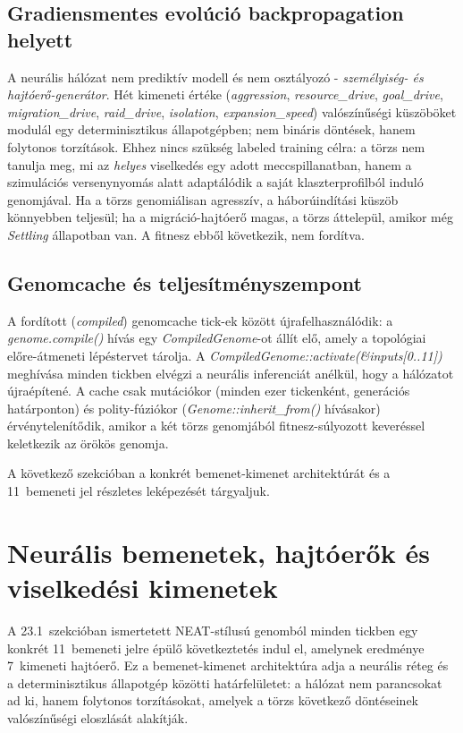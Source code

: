 \subsection*{Gradiensmentes evolúció backpropagation helyett}

A neurális hálózat nem prediktív modell és nem osztályozó - \textit{személyiség- és
hajtóerő-generátor}. Hét kimeneti értéke (\textit{aggression}, \textit{resource\_drive},
\textit{goal\_drive}, \textit{migration\_drive}, \textit{raid\_drive}, \textit{isolation},
\textit{expansion\_speed}) valószínűségi küszöböket modulál egy determinisztikus
állapotgépben; nem bináris döntések, hanem folytonos torzítások.
Ehhez nincs szükség labeled training célra: a törzs nem tanulja meg, mi az \textit{helyes}
viselkedés egy adott meccspillanatban, hanem a szimulációs versenynyomás alatt adaptálódik
a saját klaszterprofilból induló genomjával.
Ha a törzs genomiálisan agresszív, a háborúindítási küszöb könnyebben teljesül;
ha a migráció-hajtóerő magas, a törzs áttelepül, amikor még \textit{Settling} állapotban van.
A fitnesz ebből következik, nem fordítva.

\subsection*{Genomcache és teljesítményszempont}

A fordított (\textit{compiled}) genomcache tick-ek között újrafelhasználódik:
a \textit{genome.compile()} hívás egy \textit{CompiledGenome}-ot állít elő,
amely a topológiai előre-átmeneti lépéstervet tárolja.
A \textit{CompiledGenome::activate(\&inputs[0..11])} meghívása minden tickben elvégzi
a neurális inferenciát anélkül, hogy a hálózatot újraépítené.
A cache csak mutációkor (minden ezer tickenként, generációs határponton)
és polity-fúziókor (\textit{Genome::inherit\_from()} hívásakor) érvénytelenítődik,
amikor a két törzs genomjából fitnesz-súlyozott keveréssel keletkezik az örökös genomja.

A következő szekcióban a konkrét bemenet-kimenet architektúrát és a 11~bemeneti jel
részletes leképezését tárgyaljuk.

\section{Neurális bemenetek, hajtóerők és viselkedési kimenetek}
\label{sec:neurosim-25-drives}

A 23.1~szekcióban ismertetett NEAT-stílusú genomból minden tickben egy konkrét
11~bemeneti jelre épülő következtetés indul el, amelynek eredménye 7~kimeneti hajtóerő.
Ez a bem\-enet-kimenet architektúra adja a neurális réteg és a determinisztikus
állapotgép közötti határfelületet: a hálózat nem parancsokat ad ki, hanem folytonos
torzításokat, amelyek a törzs következő döntéseinek valószínűségi eloszlását alakítják.

